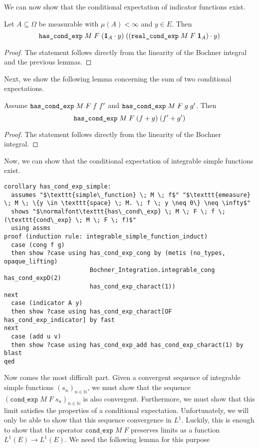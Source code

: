 We can now show that the conditional expectation of indicator functions exist.

\begin{lemma}
	Let $A \subseteq \Omega$ be measurable with $\mu(A) < \infty$ and $y \in E$. Then
	\[
		\normalfont\texttt{has\_cond\_exp} \; M \; F \; (\mathbf{1}_A \cdot y) \; ((\texttt{real\_cond\_exp} \; M \; F \; \mathbf{1}_A) \cdot y)
	\]
\end{lemma}
\begin{proof}
	The statement follows directly from the linearity of the Bochner integral and the previous lemmas.
\end{proof}

Next, we show the following lemma concerning the sum of two conditional expectations.

\begin{lemma}
	Assume $\normalfont\texttt{has\_cond\_exp} \; M \; F \; f \; f'$ and $\normalfont\texttt{has\_cond\_exp} \; M \; F \; g \; g'$. Then
	\[
		\normalfont\texttt{has\_cond\_exp} \; M \; F \; (f + g) \; (f' + g')
	\]
\end{lemma}
\begin{proof}
	The statement follows directly from the linearity of the Bochner integral.
\end{proof}

Now, we can show that the conditional expectation of integrable simple functions exist.

\begin{isalemma}
{\small
	\begin{lstlisting}[style=isabelle]
corollary has_cond_exp_simple:
  assumes "$\texttt{simple\_function} \; M \; f$" "$\texttt{emeasure} \; M \; \{y \in \texttt{space} \; M. \; f \; y \neq 0\} \neq \infty$"
  shows "$\normalfont\texttt{has\_cond\_exp} \; M \; F \; f \; (\texttt{cond\_exp} \; M \; F \; f)$"
  using assms
proof (induction rule: integrable_simple_function_induct)
  case (cong f g)
  then show ?case using has_cond_exp_cong by (metis (no_types, opaque_lifting)
						Bochner_Integration.integrable_cong has_cond_expD(2)
						has_cond_exp_charact(1))
next
  case (indicator A y)
  then show ?case using has_cond_exp_charact[OF has_cond_exp_indicator] by fast
next
  case (add u v)
  then show ?case using has_cond_exp_add has_cond_exp_charact(1) by blast
qed
	\end{lstlisting}
}
\end{isalemma}

Now comes the most difficult part. Given a convergent sequence of integrable simple functions $(s_n)_{n \in \mathbb{N}}$, we must show that the sequence $(\texttt{cond\_exp} \; M \; F \; s_n)_{n \in \mathbb{N}}$ is also convergent. Furthermore, we must show that this limit satisfies the properties of a conditional expectation. Unfortunately, we will only be able to show that this sequence convergence in $L^1$. Luckily, this is enough to show that the operator $\texttt{cond\_exp} \; M \; F$ preserves limits as a function $L^1(E) \rightarrow L^1(E)$. We need the following lemma for this purpose

